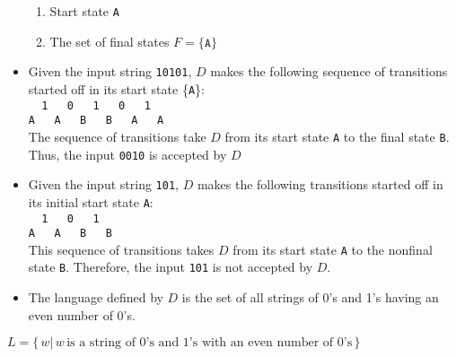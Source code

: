 \documentclass[]{article}
\begin{document}
\begin{itemize}
\begin{enumerate}
        \item Start state \texttt{A}
        \item The set of final states $F = \{ \texttt{A} \}$
      \end{enumerate}
    \item Given the input string \texttt{10101}, $D$ makes the following
    sequence of transitions started off in its start state \{\texttt{A}\}:\\
    \verb|  1   0   1   0   1  |\\
    \verb|A   A   B   B   A   A| \\
    The sequence of transitions take $D$ from its start state \texttt{A} to
    the final state \texttt{B}. Thus, the input \texttt{0010} is accepted by
    $D$
    \item Given the input string \texttt{101}, $D$ makes the following
    transitions started off in its initial start state \texttt{A}:\\
    \verb|  1   0   1  | \\
    \verb|A   A   B   B| \\
    This sequence of transitions takes $D$ from its start state \texttt{A} to
    the nonfinal state \texttt{B}. Therefore, the input \texttt{101} is not
    accepted by $D$.
    \item The language defined by $D$ is the set of all strings of 0's and 1's
    having an even number of 0's.
  \end{itemize}
  $L = \{ \, w | \, w \, \text{is a string of 0's and 1's with an even number of 0's} \, \}$
\end{document}
